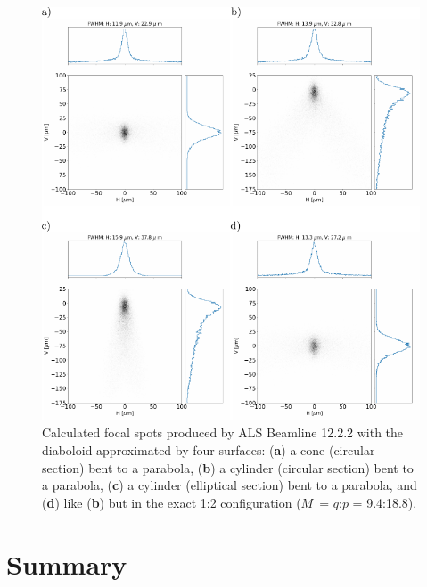 \documentclass{iucr}       %
\begin{document}
\begin{figure}\label{fig:finalcomparison}
\includegraphics[width=1.0\textwidth]{figures/fig9.pdf}
% 


\caption{Calculated focal spots produced by ALS Beamline 12.2.2 with the diaboloid approximated by four surfaces: (\textbf{a}) a cone (circular section) bent to a parabola, (\textbf{b}) a cylinder (circular section) bent to a parabola, (\textbf{c}) a cylinder (elliptical section) bent to a parabola, and (\textbf{d}) like (\textbf{b}) but in the exact 1:2 configuration ($M$~= $q$:$p$ = 9.4:18.8).}
\end{figure}

\section{Summary}
\label{sec:summary}
\end{document}
